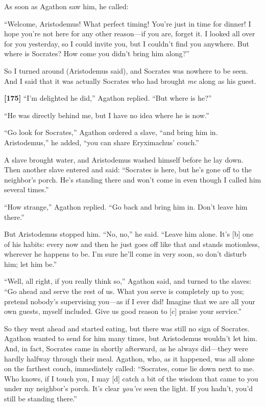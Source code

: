 As soon as Agathon saw him, he called:

“Welcome, Aristodemus! What perfect timing! You're just in time for
dinner! I hope you're not here for any other reason---if you are, forget
it. I looked all over for you yesterday, so I could invite you, but I
couldn't find you anywhere. But where is Socrates? How come you didn't
bring him along?”

So I turned around (Aristodemus said), and Socrates was nowhere to be
seen. And I said that it was actually Socrates who had brought {\em me}
along as his guest.

{\bf {[}175{]}} “I'm delighted he did,” Agathon replied. “But where is
he?”

“He was directly behind me, but I have no idea where he is now.”

“Go look for Socrates,” Agathon ordered a slave, “and bring him in.
Aristodemus,” he added, “you can share Eryximachus' couch.”

A slave brought water, and Aristodemus washed himself before he lay
down. Then another slave entered and said: “Socrates is here, but he's
gone off to the neighbor's porch. He's standing there and won't come in
even though I called him several times.”

“How strange,” Agathon replied. “Go back and bring him in. Don't leave
him there.”

But Aristodemus stopped him. “No, no,” he said. “Leave him alone. It's
{[}b{]} one of his habits: every now and then he just goes off like that
and stands motionless, wherever he happens to be. I'm sure he'll come in
very soon, so don't disturb him; let him be.”

“Well, all right, if you really think so,” Agathon said, and turned to
the slaves: “Go ahead and serve the rest of us. What you serve is
completely up to you; pretend nobody's supervising you---as if I ever
did! Imagine that we are all your own guests, myself included. Give us
good reason to {[}c{]} praise your service.”

So they went ahead and started eating, but there was still no sign of
Socrates. Agathon wanted to send for him many times, but Aristodemus
wouldn't let him. And, in fact, Socrates came in shortly afterward, as
he always did---they were hardly halfway through their meal. Agathon,
who, as it happened, was all alone on the farthest couch, immediately
called: “Socrates, come lie down next to me. Who knows, if I touch you,
I may {[}d{]} catch a bit of the wisdom that came to you under my
neighbor's porch. It's clear {\em you've} seen the light. If you hadn't,
you'd still be standing there.”

